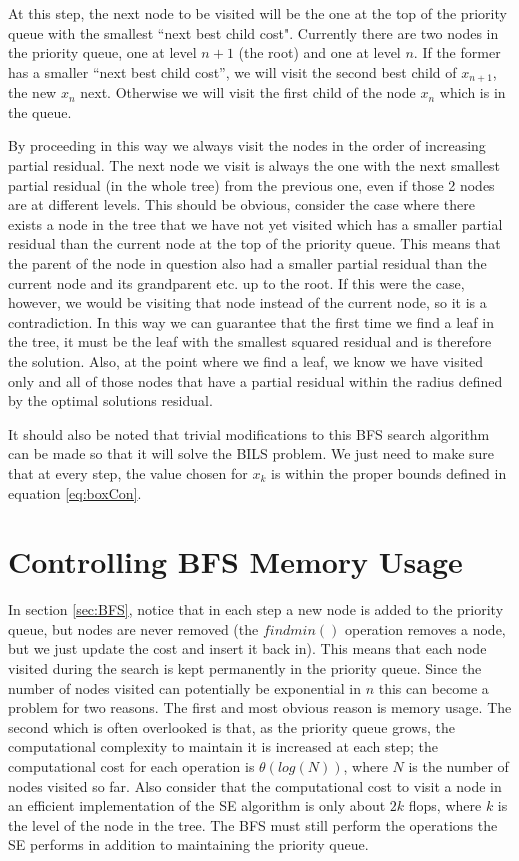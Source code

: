 \documentclass[12pt,Bold,letterpaper]{mcgilletdclass}
\newcommand{\vsp}{\vspace{\baselineskip}}
\begin{document}
At this step, the next node to be visited will be the one at the top of the priority queue with the smallest ``next best child cost". Currently there are two nodes in the priority queue, one at level $n+1$ (the root) and one at level $n$. If the former has a smaller ``next best child cost'', we will visit the second best child of $x_{n+1}$, the new $x_{n}$ next. Otherwise we will visit the first child of the node $x_{n}$ which is in the queue.

By proceeding in this way we always visit the nodes in the order of increasing partial residual. The next node we visit is always the one with the next smallest partial residual (in the whole tree) from the previous one, even if those 2 nodes are at different levels. This should be obvious, consider the case where there exists a node in the tree that we have not yet visited which has a smaller partial residual than the current node at the top of the priority queue. This means that the parent of the node in question also had a smaller partial residual than the current node and its grandparent etc. up to the root. If this were the case, however, we would be visiting that node instead of the current node, so it is a contradiction. In this way we can guarantee that the first time we find a leaf in the tree, it must be the leaf with the smallest squared residual and is therefore the solution. Also, at the point where we find a leaf, we know we have visited only and all of those nodes that have a partial residual within the radius defined by the optimal solutions residual.

It should also be noted that trivial modifications to this BFS search algorithm can be made so that it will solve the BILS problem. We just need to make sure that at every step, the value chosen for $x_k$ is within the proper bounds defined in equation \eqref{eq:boxCon}.

\vsp \section{Controlling BFS Memory Usage} \label{sec:controlBFS}

In section \ref{sec:BFS}, notice that in each step a new node is added to the priority queue, but nodes are never removed (the $findmin()$ operation removes a node, but we just update the cost and insert it back in). This means that each node visited during the search is kept permanently in the priority queue. Since the number of nodes visited can potentially be exponential in $n$ this can become a problem for two reasons. The first and most obvious reason is memory usage. The second which is often overlooked is that, as the priority queue grows, the computational complexity to maintain it is increased at each step; the computational cost for each operation is $\theta(log(N))$, where $N$ is the number of nodes visited so far. Also consider that the computational cost to visit a node in an efficient implementation of the SE algorithm is only about $2k$ flops, where $k$ is the level of the node in the tree. The BFS must still perform the operations the SE performs in addition to maintaining the priority queue.
\end{document}
